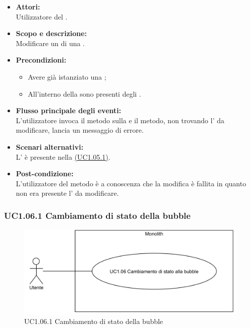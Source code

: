 \begin{itemize}
	\item \textbf{Attori:}
	\\Utilizzatore del .
	\item \textbf{Scopo e descrizione:} 
	\\Modificare un  di una .
	\item \textbf{Precondizioni:}
	\begin{itemize}
		\item Avere già istanziato una ;
		\item All'interno della  sono presenti degli .
	\end{itemize}
	\item \textbf{Flusso principale degli eventi:}
	\\L'utilizzatore invoca il metodo sulla  e il metodo, non trovando l' da modificare, lancia un messaggio di errore.
	\item \textbf{Scenari alternativi:}
	\\L' è presente nella  \hyperref[UC1.05.1]{(UC1.05.1)}.
	\item \textbf{Post-condizione:}
	\\L'utilizzatore del metodo è a conoscenza che la modifica è fallita in quanto non era presente l' da modificare.
\end{itemize}

\subsubsection{UC1.06.1 Cambiamento di stato della bubble} \label{UC1.06.1}

\begin{figure}[H]
	\centering
	\includegraphics[width=15cm]{../../documenti/AnalisiDeiRequisiti/Diagrammi_img/uc1_06.png}
	\caption{UC1.06.1 Cambiamento di stato della bubble}
\end{figure}

